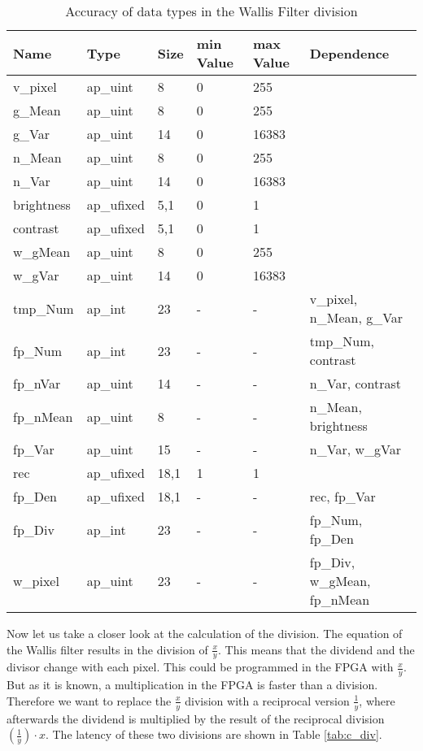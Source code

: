 \begin{table}[tb!]
    \centering
    \begin{tabular}{l l l l l l}
        \toprule
        Name & Type & Size & min Value & max Value & Dependence \\
        \midrule
        v\_pixel & ap\_uint & 8 & 0 & 255 & \\
        g\_Mean & ap\_uint & 8 & 0 & 255 &  \\
        g\_Var & ap\_uint & 14 & 0 & 16383 &  \\
        n\_Mean & ap\_uint & 8 & 0 & 255 &  \\
        n\_Var & ap\_uint & 14 & 0 & 16383 &  \\
        brightness & ap\_ufixed & 5,1 & 0 & 1 &  \\
        contrast & ap\_ufixed & 5,1 & 0 & 1 &  \\
        w\_gMean & ap\_uint & 8 & 0 & 255 &  \\
        w\_gVar & ap\_uint & 14 & 0 & 16383 &  \\
        tmp\_Num & ap\_int & 23 & - & - &  v\_pixel, n\_Mean, g\_Var \\
        fp\_Num & ap\_int & 23 & - & - &  tmp\_Num, contrast \\
        fp\_nVar & ap\_uint & 14 & - & - &  n\_Var, contrast \\
        fp\_nMean & ap\_uint & 8 & - & - &  n\_Mean, brightness \\
        fp\_Var & ap\_uint & 15 & - & - &  n\_Var, w\_gVar \\
        rec & ap\_ufixed & 18,1 & 1 & 1 &   \\
        fp\_Den & ap\_ufixed & 18,1 & - & - &  rec, fp\_Var \\
        fp\_Div & ap\_int & 23 & - & - &  fp\_Num, fp\_Den \\
        w\_pixel & ap\_uint & 23 & - & - &  fp\_Div, w\_gMean, fp\_nMean \\
        \bottomrule
    \end{tabular}
    \caption{Accuracy of data types in the Wallis Filter division}
    \label{tab:datatypes}
\end{table}

Now let us take a closer look at the calculation of the division. The equation
of the Wallis filter results in the division of $\frac{x}{y}$. This means that
the dividend and the divisor change with each pixel. This could be programmed in
the FPGA with $\frac{x}{y}$. But as it is known, a multiplication in the FPGA is
faster than a division. Therefore we want to replace the $\frac{x}{y}$ division with a reciprocal version $\frac{1}{y}$, where afterwards the dividend is multiplied by the result of the reciprocal division $(\frac{1}{y}) \cdot x$. The latency of these two divisions are shown in Table \ref{tab:c_div}. \\

